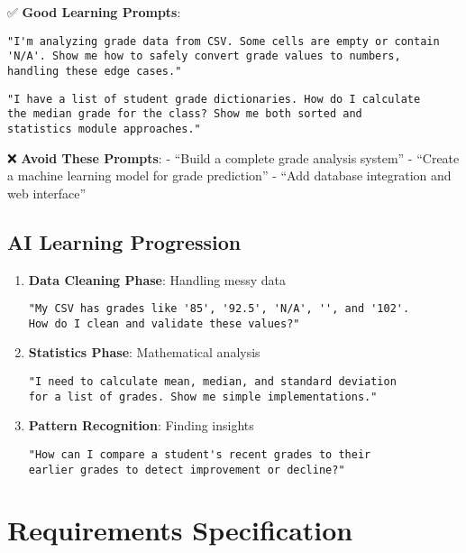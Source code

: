 \documentclass[
  letterpaper,
  DIV=11,
  numbers=noendperiod,
  oneside]{scrreprt}
\begin{document}
✅ \textbf{Good Learning Prompts}:

\begin{verbatim}
"I'm analyzing grade data from CSV. Some cells are empty or contain 
'N/A'. Show me how to safely convert grade values to numbers, 
handling these edge cases."
\end{verbatim}

\begin{verbatim}
"I have a list of student grade dictionaries. How do I calculate 
the median grade for the class? Show me both sorted and 
statistics module approaches."
\end{verbatim}

❌ \textbf{Avoid These Prompts}: - ``Build a complete grade analysis
system'' - ``Create a machine learning model for grade prediction'' -
``Add database integration and web interface''

\subsection{AI Learning Progression}\label{ai-learning-progression-8}

\begin{enumerate}
\def\labelenumi{\arabic{enumi}.}
\item
  \textbf{Data Cleaning Phase}: Handling messy data

\begin{verbatim}
"My CSV has grades like '85', '92.5', 'N/A', '', and '102'. 
How do I clean and validate these values?"
\end{verbatim}
\item
  \textbf{Statistics Phase}: Mathematical analysis

\begin{verbatim}
"I need to calculate mean, median, and standard deviation 
for a list of grades. Show me simple implementations."
\end{verbatim}
\item
  \textbf{Pattern Recognition}: Finding insights

\begin{verbatim}
"How can I compare a student's recent grades to their 
earlier grades to detect improvement or decline?"
\end{verbatim}
\end{enumerate}

\section{Requirements Specification}\label{requirements-specification-8}
\end{document}
